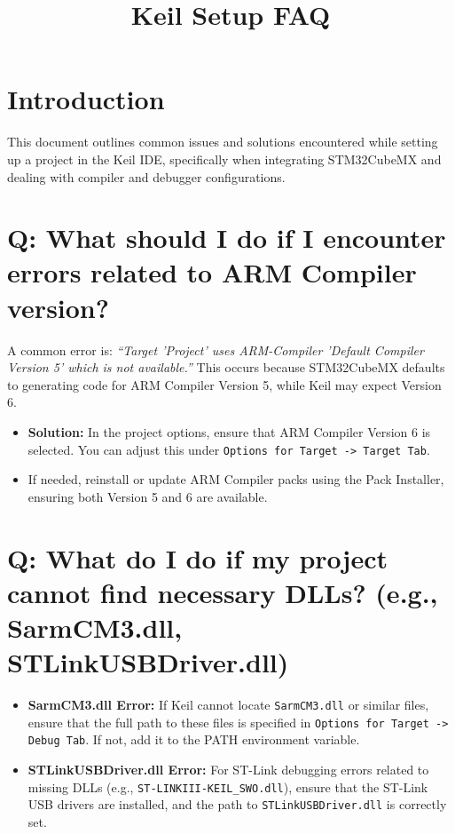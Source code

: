 \documentclass{article}
\title{Keil Setup FAQ}
\author{}
\date{}
\begin{document}
\maketitle

\section*{Introduction}

This document outlines common issues and solutions encountered while setting up a project in the Keil IDE, specifically when integrating STM32CubeMX and dealing with compiler and debugger configurations.

\section*{Q: What should I do if I encounter errors related to ARM Compiler version?}

A common error is: \textit{“Target 'Project' uses ARM-Compiler 'Default Compiler Version 5' which is not available.”} This occurs because STM32CubeMX defaults to generating code for ARM Compiler Version 5, while Keil may expect Version 6. 

\begin{itemize}
    \item \textbf{Solution:} In the project options, ensure that ARM Compiler Version 6 is selected. You can adjust this under \texttt{Options for Target -> Target Tab}.
    \item If needed, reinstall or update ARM Compiler packs using the Pack Installer, ensuring both Version 5 and 6 are available.
\end{itemize}

\section*{Q: What do I do if my project cannot find necessary DLLs? (e.g., SarmCM3.dll, STLinkUSBDriver.dll)}

\begin{itemize}
    \item \textbf{SarmCM3.dll Error:} If Keil cannot locate \texttt{SarmCM3.dll} or similar files, ensure that the full path to these files is specified in \texttt{Options for Target -> Debug Tab}. If not, add it to the PATH environment variable.
    \item \textbf{STLinkUSBDriver.dll Error:} For ST-Link debugging errors related to missing DLLs (e.g., \texttt{ST-LINKIII-KEIL\_SWO.dll}), ensure that the ST-Link USB drivers are installed, and the path to \texttt{STLinkUSBDriver.dll} is correctly set.
\end{itemize}
\end{document}
